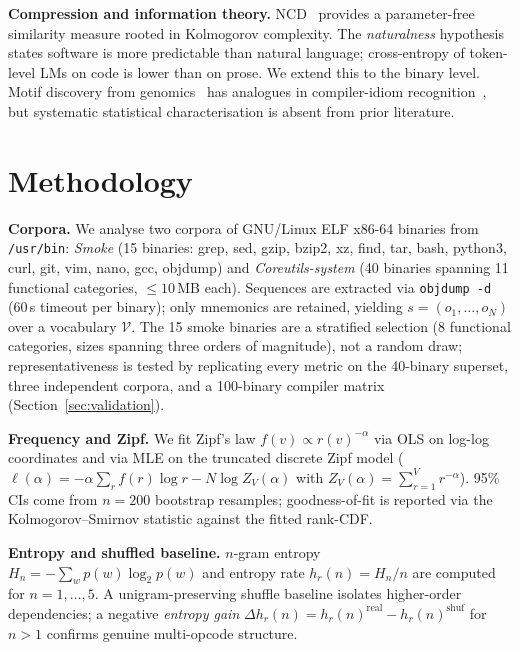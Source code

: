 \documentclass[conference]{IEEEtran}
\newcommand{\hr}[1]{h_r(#1)}
\begin{document}
\textbf{Compression and information theory.}
NCD~\cite{cilibrasi2005clustering} provides a parameter-free similarity
measure rooted in Kolmogorov complexity.  The
\emph{naturalness} hypothesis~\cite{hindle2012naturalness,tu2014localness}
states software is more predictable than natural language; cross-entropy of
token-level LMs on code is lower than on prose.  We extend this to the
binary level.  Motif discovery from genomics~\cite{das2007survey} has
analogues in compiler-idiom recognition~\cite{schulte2018evolving}, but
systematic statistical characterisation is absent from prior literature.

\section{Methodology}
\label{sec:methodology}

\textbf{Corpora.}  We analyse two corpora of GNU/Linux ELF x86-64 binaries
from \texttt{/usr/bin}: \emph{Smoke} (15 binaries: grep, sed, gzip, bzip2,
xz, find, tar, bash, python3, curl, git, vim, nano, gcc, objdump) and
\emph{Coreutils-system} (40 binaries spanning 11 functional categories,
$\leq 10$\,MB each).  Sequences are extracted via \texttt{objdump -d}
(60\,s timeout per binary); only mnemonics are retained, yielding
$s{=}(o_1,\dots,o_N)$ over a vocabulary $\mathcal{V}$.  The 15 smoke
binaries are a stratified selection (8 functional categories, sizes
spanning three orders of magnitude), not a random draw; representativeness
is tested by replicating every metric on the 40-binary superset, three
independent corpora, and a 100-binary compiler matrix
(Section~\ref{sec:validation}).

\textbf{Frequency and Zipf.}
We fit Zipf's law $f(v)\propto r(v)^{-\alpha}$ via OLS on log-log
coordinates and via MLE on the truncated discrete Zipf model
($\ell(\alpha){=}-\alpha\sum_r f(r)\log r - N\log Z_V(\alpha)$ with
$Z_V(\alpha){=}\sum_{r=1}^V r^{-\alpha}$).  95\% CIs come from
$n{=}200$ bootstrap resamples; goodness-of-fit is reported via the
Kolmogorov--Smirnov statistic against the fitted rank-CDF.

\textbf{Entropy and shuffled baseline.}
$n$-gram entropy $H_n{=}-\sum_w p(w)\log_2 p(w)$ and entropy rate
$\hr{n}{=}H_n/n$ are computed for $n{=}1,\dots,5$.  A unigram-preserving
shuffle baseline isolates higher-order dependencies; a negative
\emph{entropy gain} $\Delta\hr{n}{=}\hr{n}^{\text{real}}-\hr{n}^{\text{shuf}}$
for $n{>}1$ confirms genuine multi-opcode structure.
\end{document}
